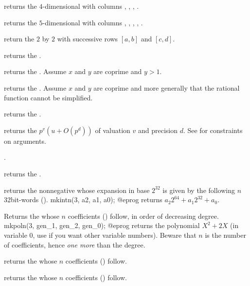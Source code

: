 returns the $4$-dimensional  with columns
, , , .

returns the $5$-dimensional  with columns
, , , , .

 return the $2$ by $2$
 with successive rows $[a,b]$ and $[c,d]$.

returns the  .

returns the  . Assume $x$ and $y$ are coprime and $y > 1$.

returns the  . Assume $x$ and $y$ are coprime and more
generally that the rational function cannot be simplified.

returns the  .

 returns the
 $p^v(u + O(p^d))$ of valuation $v$ and precision $d$. See
 for constraints on arguments.

.

returns the  .

\smallskip

 returns the nonnegative  whose
expansion in base $2^{32}$ is given by the following $n$ 32bit-words
().
\bprog
  mkintn(3, a2, a1, a0);
@eprog
\noindent returns $a_2 2^{64} + a_1 2^{32} + a_0$.

 Returns the  whose $n$
coefficients () follow, in order of decreasing degree.
\bprog
  mkpoln(3, gen_1, gen_2, gen_0);
@eprog
\noindent returns the polynomial $X^2 + 2X$ (in variable $0$, use
 if you want other variable numbers). Beware that $n$ is the
number of coefficients, hence \emph{one more} than the degree.

 returns the  whose $n$
coefficients () follow.

 returns the  whose $n$
coefficients () follow.

